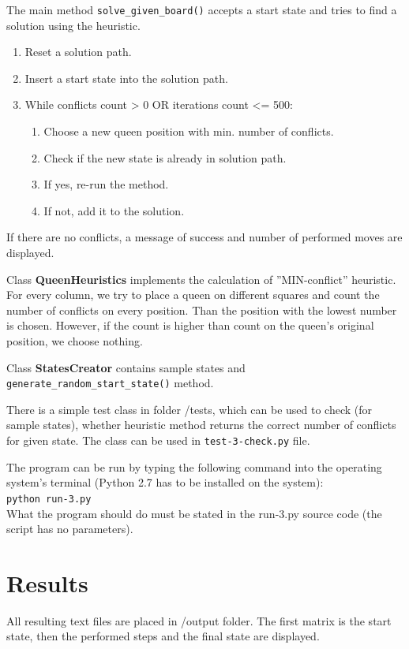 \documentclass[a4paper]{article}
\begin{document}
The main method \verb|solve_given_board()| accepts a start state and tries to find a solution using the heuristic.
\begin{enumerate}
\item Reset a solution path.
\item Insert a start state into the solution path.
\item While conflicts count > 0 OR iterations count <= 500:
	\begin{enumerate}
	\item Choose a new queen position with min. number of conflicts.
	\item Check if the new state is already in solution path.
	\item If yes, re-run the method.
	\item If not, add it to the solution.
	\end{enumerate}
\end{enumerate}
If there are no conflicts, a message of success and number of performed moves are displayed.

Class \textbf{QueenHeuristics} implements the calculation of ''MIN-conflict'' heuristic. For every column, we try to place a queen  on different squares and count the number of conflicts on every position. Than the position with the lowest number is chosen. However, if the count is higher than count on the queen's original position, we choose nothing.

Class \textbf{StatesCreator} contains sample states and \verb|generate_random_start_state()| method.

There is a simple test class in folder /tests, which can be used to check (for sample states), whether heuristic method returns the correct number of conflicts for given state. The class can be used in \verb|test-3-check.py| file.

The program can be run by typing the following command into the operating system's terminal (Python 2.7 has to be installed on the system): \\ 
\verb|python run-3.py| \\
What the program should do must be stated in the run-3.py source code (the script has no parameters).

\section{Results}
All resulting text files are placed in /output folder. The first matrix is the start state, then the performed steps and the final state are displayed.
\end{document}
